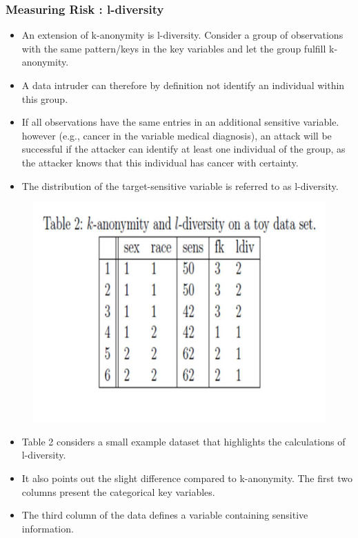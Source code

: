 \documentclass{beamer}
\begin{document}
	\begin{frame}
		\frametitle{Measuring Risk : l-diversity}
		\begin{itemize}	
			\item An extension of k-anonymity is l-diversity. Consider
			a group of observations with the same pattern/keys in the key variables and let
			the group fulfill k-anonymity. \item A data intruder can therefore by definition not
			identify an individual within this group. 
			\item If all observations have the same entries
			in an additional sensitive variable. however (e.g., cancer in the variable medical
			diagnosis), an attack will be successful if the attacker can identify at least one
			individual of the group, as the attacker knows that this individual has cancer
			with certainty. 
			\item The distribution of the target-sensitive variable is referred to as
			l-diversity.
		\end{itemize}
	\end{frame}
	
	\begin{frame}
		\begin{figure}
			\centering
			\includegraphics[width=0.7\linewidth]{TemplJPGs2/Table2}
			\caption{}
			\label{fig:Table2}
		\end{figure}
		
	\end{frame}
	\begin{frame}
		\begin{itemize}
			\item		Table 2 considers a small example dataset that highlights the calculations of
			l-diversity.
			\item  It also points out the slight difference compared to k-anonymity. The
			ﬁrst two columns present the categorical key variables. 
			\item The third column of the
			data deﬁnes a variable containing sensitive information. 
		\end{itemize}
	\end{frame}
	
\end{document}
